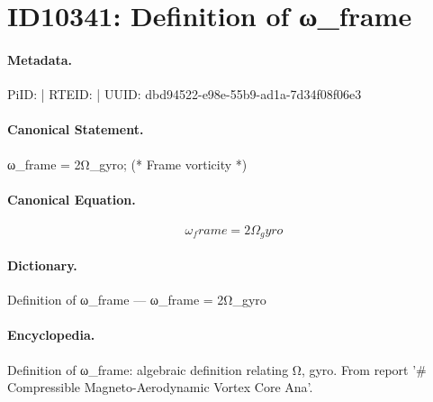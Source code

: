 \section*{ID10341: Definition of ω\_frame}
\paragraph{Metadata.}
PiID:  | RTEID:  | UUID: dbd94522-e98e-55b9-ad1a-7d34f08f06e3

\paragraph{Canonical Statement.}
ω\_frame = 2Ω\_gyro; (* Frame vorticity *)

\paragraph{Canonical Equation.}
\[
ω_frame = 2Ω_gyro
\]

\paragraph{Dictionary.}
Definition of ω\_frame — ω\_frame = 2Ω\_gyro

\paragraph{Encyclopedia.}
Definition of ω\_frame: algebraic definition relating Ω, gyro. From report '\# Compressible Magneto-Aerodynamic Vortex Core Ana'.

